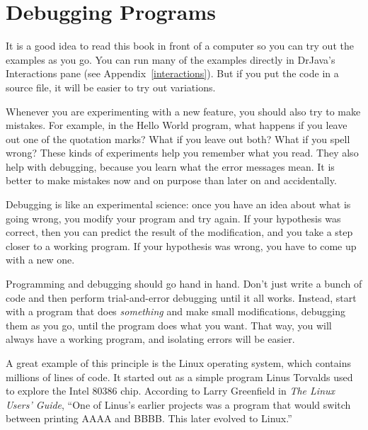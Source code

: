 \section{Debugging Programs}
\label{computer-programming_debugging-programs}

It is a good idea to read this book in front of a computer so you can try out the examples as you go.
You can run many of the examples directly in DrJava's Interactions pane (see Appendix~\ref{interactions}).
But if you put the code in a source file, it will be easier to try out variations.


Whenever you are experimenting with a new feature, you should also try to make mistakes.
For example, in the Hello World program, what happens if you leave out one of the quotation marks?
What if you leave out both?
What if you spell  wrong?
These kinds of experiments help you remember what you read.
They also help with debugging, because you learn what the error messages mean.
It is better to make mistakes now and on purpose than later on and accidentally.



Debugging is like an experimental science: once you have an idea about what is going wrong, you modify your program and try again.
If your hypothesis was correct, then you can predict the result of the modification, and you take a step closer to a working program.
If your hypothesis was wrong, you have to come up with a new one.

Programming and debugging should go hand in hand.
Don't just write a bunch of code and then perform trial-and-error debugging until it all works.
Instead, start with a program that does {\em something} and make small modifications, debugging them as you go, until the program does what you want.
That way, you will always have a working program, and isolating errors will be easier.


A great example of this principle is the Linux operating system, which contains millions of lines of code.
It started out as a simple program Linus Torvalds used to explore the Intel 80386 chip.
According to Larry Greenfield in {\it The Linux Users' Guide}, ``One of Linus's earlier projects was a program that would switch between printing AAAA and BBBB.
This later evolved to Linux.''

